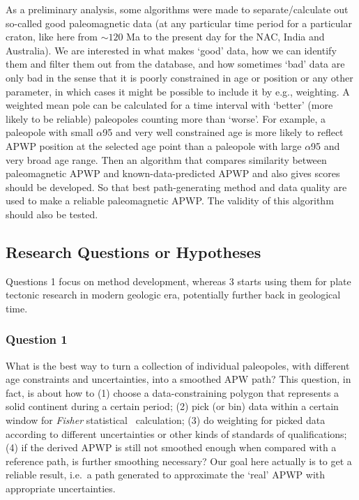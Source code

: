 As a preliminary analysis, some algorithms were made to separate/calculate out
so-called good paleomagnetic data (at any particular time period for a
particular craton, like here from ${\sim}120$ Ma to the present day for the
NAC, India and Australia). We are interested in what makes `good' data, how we
can identify them and filter them out from the database, and how sometimes `bad'
data are only bad in the sense that it is poorly constrained in age or position
or any other parameter, in which cases it might be possible to include it by
e.g., weighting. A weighted mean pole can be calculated for a time interval with
`better' (more likely to be reliable) paleopoles counting more than `worse'. For
example, a paleopole with small $\alpha$95 and very well constrained age is more
likely to reflect APWP position at the selected age point than a paleopole with
large $\alpha$95 and very broad age range. Then an algorithm that compares
similarity between paleomagnetic APWP and known-data-predicted APWP and also
gives scores should be developed. So that best path-generating method and data
quality are used to make a reliable paleomagnetic APWP\@. The validity of this
algorithm should also be tested.

\subsection{Research Questions or Hypotheses}

Questions 1 focus on method development, whereas 3 starts
using them for plate tectonic research in modern geologic era, potentially
further back in geological time.

\subsubsection{Question 1}

What is the best way to turn a collection of individual paleopoles, with
different age constraints and uncertainties, into a smoothed APW path? This
question, in fact, is about how to (1) choose a data-constraining polygon that
represents a solid continent during a certain period; (2) pick (or bin) data
within a certain window for \emph{Fisher} statistical~\citep{F53} calculation; (3) do
weighting for picked data according to different uncertainties or other kinds of
standards of qualifications; (4) if the derived APWP is still not smoothed
enough when compared with a reference path, is further smoothing necessary? Our
goal here actually is to get a reliable result, i.e.\ a path generated to
approximate the `real' APWP with appropriate uncertainties.

